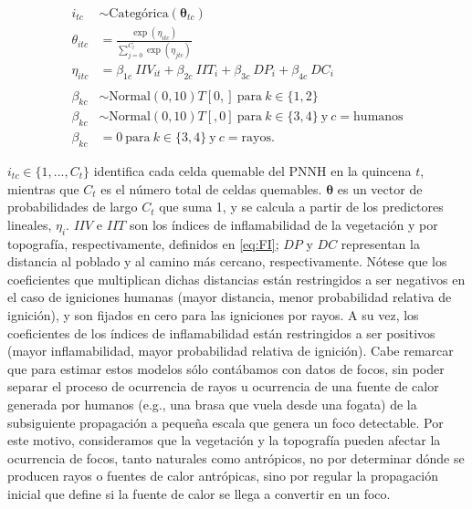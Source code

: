 \begin{equation}
\label{eq:igspat}
\begin{aligned}
    i_{tc} &\sim \text{Categórica}(\boldsymbol{\theta}_{tc}) \\
    \theta_{itc} &= \frac{\exp{(\eta_{itc})}}{\sum_{j=0}^{C_t} \exp{(\eta_{jtc})}} \\
    \eta_{itc} &= \beta_{1c} \ IIV_{it} + \beta_{2c} \ IIT_i + \beta_{3c} \ DP_i + \beta_{4c} \ DC_i\\
    \\
    \beta_{kc} &\sim \text{Normal}(0, 10)T[0, ] \  \text{para} \ k \in \{1, 2\} \\
    \beta_{kc} &\sim \text{Normal}(0, 10)T[, 0] \  \text{para} \ k \in \{3, 4\} \ \text{y}\  c = \text{humanos} \\
    \beta_{kc} &= 0 \  \text{para} \ k \in \{3, 4\} \ \text{y}\  c = \text{rayos}.
\end{aligned}
\end{equation}

\noindent $i_{tc} \in \{1, ..., C_t\}$ identifica cada celda quemable del PNNH en la quincena $t$, mientras que $C_t$ es el número total de celdas quemables. $\boldsymbol{\theta}$ es un vector de probabilidades de largo $C_t$ que suma 1, y se calcula a partir de los predictores lineales, $\eta_i$. $IIV$ e $IIT$ son los índices de inflamabilidad de la vegetación y por topografía, respectivamente, definidos en \eqref{eq:FI}; $DP$ y $DC$ representan la distancia al poblado y al camino más cercano, respectivamente. Nótese que los coeficientes que multiplican dichas distancias están restringidos a ser negativos en el caso de igniciones humanas (mayor distancia, menor probabilidad relativa de ignición), y son fijados en cero para las igniciones por rayos. A su vez, los coeficientes de los índices de inflamabilidad están restringidos a ser positivos (mayor inflamabilidad, mayor probabilidad relativa de ignición). Cabe remarcar que para estimar estos modelos sólo contábamos con datos de focos, sin poder separar el proceso de ocurrencia de rayos u ocurrencia de una fuente de calor generada por humanos (e.g., una brasa que vuela desde una fogata) de la subsiguiente propagación a pequeña escala que genera un foco detectable. Por este motivo, consideramos que la vegetación y la topografía pueden afectar la ocurrencia de focos, tanto naturales como antrópicos, no por determinar dónde se producen rayos o fuentes de calor antrópicas, sino por regular la propagación inicial que define si la fuente de calor se llega a convertir en un foco. 

